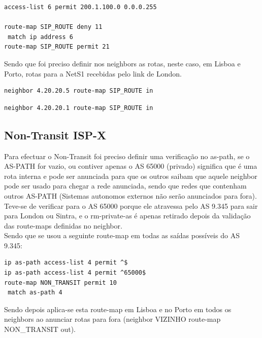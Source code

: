 \documentclass[11pt,a4paper]{report}
\begin{document}
\begin{lstlisting}[caption=Route-map SIP\_ROUTE para cancelar rotas]
access-list 6 permit 200.1.100.0 0.0.0.255

route-map SIP_ROUTE deny 11
 match ip address 6
route-map SIP_ROUTE permit 21
\end{lstlisting}

Sendo que foi preciso definir nos neighbors as rotas, neste caso, em Lisboa e Porto, rotas para a NetS1 recebidas pelo link de London.\\

\begin{lstlisting}[caption=Cancelar rota para NetS1 recebida em Lisboa por London]
neighbor 4.20.20.5 route-map SIP_ROUTE in
\end{lstlisting}

\begin{lstlisting}[caption=Cancelar rota para NetS1 recebida no Porto por London]
neighbor 4.20.20.1 route-map SIP_ROUTE in
\end{lstlisting}

\subsection{Non-Transit ISP-X}

Para efectuar o Non-Transit foi preciso definir uma verificação no as-path, se o AS-PATH for vazio, ou contiver apenas o AS 65000 (privado) significa que é uma rota interna e pode ser anunciada para que os outros saibam que aquele neighbor pode ser usado para chegar a rede anunciada, sendo que redes que contenham outros AS-PATH (Sistemas autonomos externos não serão anunciados para fora).\\

Teve-se de verificar para o AS 65000 porque ele atravessa pelo AS 9.345 para sair para London ou Sintra, e o rm-private-as é apenas retirado depois da validação das route-maps definidas no neighbor.\\

Sendo que se usou a seguinte route-map em todas as saídas possíveis do AS 9.345:

\begin{lstlisting}[caption=Tornar ISP X num AS Non-Transit]
ip as-path access-list 4 permit ^$
ip as-path access-list 4 permit ^65000$
route-map NON_TRANSIT permit 10
 match as-path 4
\end{lstlisting}

Sendo depois aplica-se esta route-map em Lisboa e no Porto em todos os neighbors ao anunciar rotas para fora (neighbor VIZINHO route-map NON\_TRANSIT out).
\end{document}

